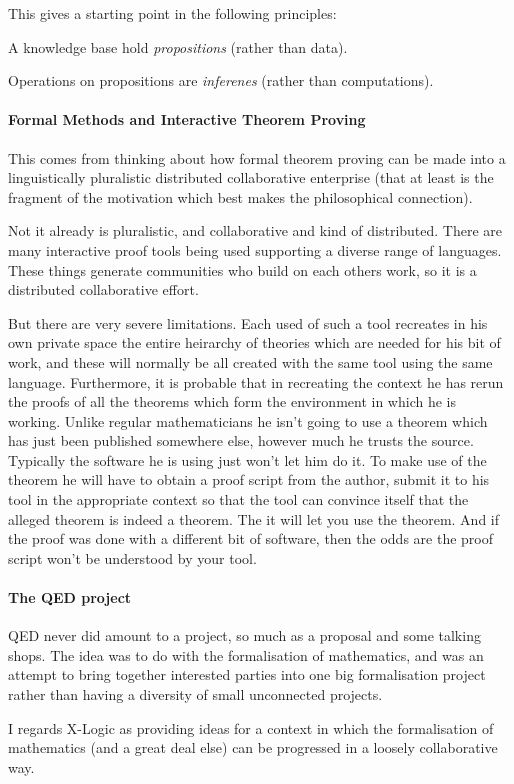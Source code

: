 This gives a starting point in the following principles:

\begin{iprin}
A knowledge base hold \emph{propositions} (rather than data).
\end{iprin}

\begin{iprin}
Operations on propositions are \emph{inferenes} (rather than computations).
\end{iprin}

\paragraph{Formal Methods and Interactive Theorem Proving}

This comes from thinking about how formal theorem proving can be made into a linguistically pluralistic distributed collaborative enterprise (that at least is the fragment of the motivation which best makes the philosophical connection).

Not it already is pluralistic, and collaborative and kind of distributed.
There are many interactive proof tools being used supporting a diverse range of languages.
These things generate communities who build on each others work, so it is a distributed collaborative effort.

But there are very severe limitations.
Each used of such a tool recreates in his own private space the entire heirarchy of theories which are needed for his bit of work, and these will normally be all created with the same tool using the same language.
Furthermore, it is probable that in recreating the context he has rerun the proofs of all the theorems which form the environment in which he is working.
Unlike regular mathematicians he isn't going to use a theorem which has just been published somewhere else, however much he trusts the source.
Typically the software he is using just won't let him do it.
To make use of the theorem he will have to obtain a proof script from the author, submit it to his tool in the appropriate context so that the tool can convince itself that the alleged theorem is indeed a theorem.
The it will let you use the theorem.
And if the proof was done with a different bit of software, then the odds are the proof script won't be understood by your tool.

\paragraph{The QED project}

QED never did amount to a project, so much as a proposal and some talking shops.
The idea was to do with the formalisation of mathematics, and was an attempt to bring together interested parties into one big formalisation project rather than having a diversity of small unconnected projects.

I regards X-Logic as providing ideas for a context in which the formalisation of mathematics (and a great deal else) can be progressed in a loosely collaborative way.

\paragraph{}
